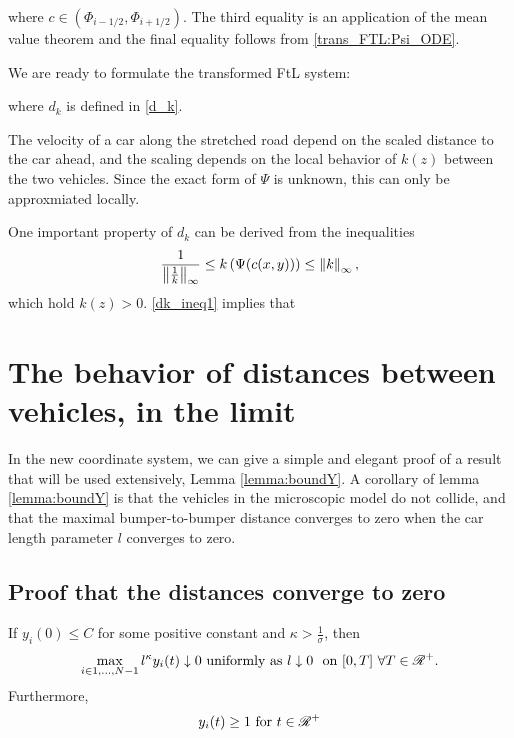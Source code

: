 where $c \in (\Phi_{i-1/2},  \Phi_{i+1/2})$. The third equality is an application of the mean value theorem and the final equality follows from \eqref{trans_FTL:Psi_ODE}. 



We are ready to formulate the transformed FtL system:


where $d_k$ is defined in \eqref{d_k}. 




The velocity of a car along the stretched road depend on the scaled distance to the car ahead, and the scaling depends on the local behavior of $k(z)$ between the two vehicles. Since the exact form of $\Psi$ is unknown, this can only be approxmiated locally. %

One important property of $d_k$ can be derived from the inequalities 
\begin{equation} \label{dk_ineq1}
	\frac{1}{\left\lVert\frac{1}{k}\right\rVert_\infty} \leq k\left(\Psi(c(x,y))\right) \leq \left\lVert k\right\rVert_\infty, 
\end{equation} 
which hold $k(z) > 0$. \eqref{dk_ineq1} implies that 


\fi

\section{The behavior of distances between vehicles, in the limit} \label{section:distance_cars}

In the new coordinate system, we can give a simple and elegant proof of a result that will be used extensively, Lemma \eqref{lemma:boundY}. A corollary of lemma \eqref{lemma:boundY} is that the vehicles in the microscopic model do not collide, and that the maximal bumper-to-bumper distance converges to zero when the car length parameter $l$ converges to zero.

\subsection{Proof that the distances converge to zero}

\begin{lemma} \label{lemma:boundY}
	If $y_i(0) \leq C$ for some positive constant and $\kappa > \frac{1}{\sigma}$, then 
	\begin{equation}
		\max_{i \in {1,...,N-1}} l^\kappa y_i(t) \downarrow 0\text{ uniformly as } l \downarrow 0 \, \, \text{ on } [0,T] \,\, \forall T \in \mathscr{R}^+. 
	\end{equation}
	Furthermore, 
	\begin{equation} \label{lemma:boundY:imageY}
		y_i(t) \geq 1 \text{ for } t \in \mathscr{R}^+
 	\end{equation}
\end{lemma}



